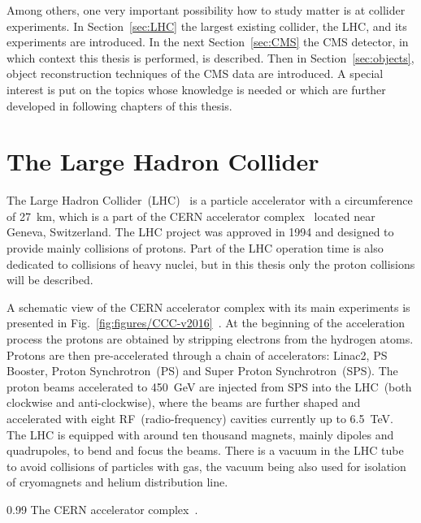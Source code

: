 \clearpage

\setcounter{secnumdepth}{4}
\setcounter{secnumdepth}{5}

Among others, one very important possibility how to study matter is at collider experiments. In Section~\ref{sec:LHC} the largest existing collider, the LHC, and its experiments are introduced. In the next Section~\ref{sec:CMS} the CMS detector, in which context this thesis is performed, is described. Then in Section~\ref{sec:objects}, object reconstruction techniques of the CMS data are introduced. A special interest is put on the topics whose knowledge is needed or which are further developed in following chapters of this thesis.

\section{The Large Hadron Collider~\label{sec:LHC}}

The Large Hadron Collider~(LHC)~\cite{CERN-Brochure-2017-002-Eng, Evans:2008zzb} is a particle accelerator with a circumference of 27~km, which is a part of the CERN accelerator complex~\cite{Mobs:2225847} located near Geneva, Switzerland. The LHC project was approved in 1994 and designed to provide mainly collisions of protons. Part of the LHC operation time is also dedicated to collisions of heavy nuclei, but in this thesis only the proton collisions will be described.

A schematic view of the CERN accelerator complex with its main experiments is presented in Fig.~\ref{fig:figures/CCC-v2016}~\cite{Mobs:2225847}. At the beginning of the acceleration process the protons are obtained by stripping electrons from the hydrogen atoms. Protons are then pre-accelerated through a chain of accelerators: Linac2, PS Booster, Proton Synchrotron~(PS) and Super Proton Synchrotron~(SPS). The proton beams accelerated to 450~GeV are injected from SPS into the LHC~(both clockwise and anti-clockwise), where the beams are further shaped and accelerated with eight RF~(radio-frequency) cavities currently up to 6.5~TeV. The LHC is equipped with around ten thousand magnets, mainly dipoles and quadrupoles, to bend and focus the beams. There is a vacuum in the LHC tube to avoid collisions of particles with gas, the vacuum being also used for isolation of cryomagnets and helium distribution line.

                 {0.99}       %
                 { The CERN accelerator complex~\cite{Mobs:2225847}. }


